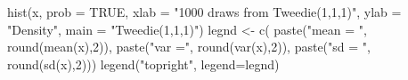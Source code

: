 \begin{Schunk}
\begin{Sinput}
  hist(x, prob = TRUE, xlab = "1000 draws from Tweedie(1,1,1)", ylab = "Density", main = "Tweedie(1,1,1)")
  legnd <- c( paste("mean = ", round(mean(x),2)), paste("var =", round(var(x),2)), paste("sd = ", round(sd(x),2)))
  legend("topright", legend=legnd)
\end{Sinput}
\end{Schunk}
